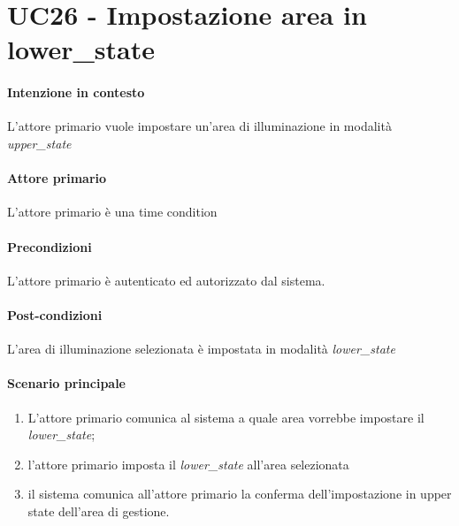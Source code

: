 \section{UC26 - Impostazione area in lower\_state}\label{uc:26}
\paragraph{Intenzione in contesto} L'attore primario vuole impostare un'area di illuminazione in modalità \textit{upper\_state}
\paragraph{Attore primario} L'attore primario è una time condition %
\paragraph{Precondizioni} L'attore primario è autenticato ed autorizzato dal sistema.
\paragraph{Post-condizioni} L'area di illuminazione selezionata è impostata in modalità \textit{lower\_state}
\paragraph{Scenario principale}
\begin{enumerate}
    \item L'attore primario comunica al sistema a quale area vorrebbe impostare il \textit{lower\_state};
    \item l'attore primario imposta il \textit{lower\_state} all'area selezionata
    \item il sistema comunica all'attore primario la conferma dell'impostazione in upper state dell'area di gestione.
\end{enumerate}